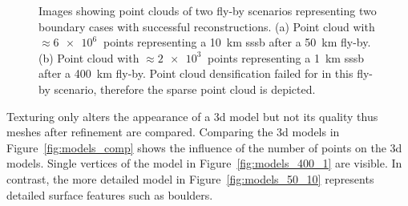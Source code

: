 \begin{figure}[htb]
\begin{subfigure}[b]{0.42\textwidth}
            \caption{}
            \label{fig:points_400_1}
        \end{subfigure}
    \caption{Images showing point clouds of two fly-by scenarios representing two boundary cases with successful reconstructions. (a) Point cloud with $\approx\SI{6e6}{}$ points representing a \SI{10}{\kilo\meter} \gls{sssb} after a \SI{50}{\kilo\meter} fly-by. (b) Point cloud with $\approx\SI{2e3}{}$ points representing a \SI{1}{\kilo\meter} \gls{sssb} after a \SI{400}{\kilo\meter} fly-by. Point cloud densification failed for in this fly-by scenario, therefore the sparse point cloud is depicted.}
    \label{fig:points_dense_comp}
\end{figure}

Texturing only alters the appearance of a \gls{3d} model but not its quality thus meshes after refinement are compared. Comparing the \gls{3d} models in Figure~\ref{fig:models_comp} shows the influence of the number of points on the \gls{3d} models. Single vertices of the model in Figure~\ref{fig:models_400_1} are visible. In contrast, the more detailed model in Figure~\ref{fig:models_50_10} represents detailed surface features such as boulders.

